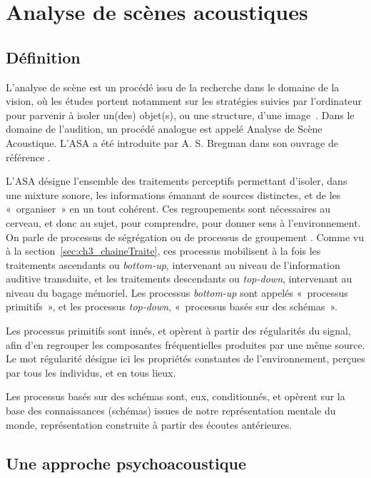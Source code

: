 \section{Analyse de scènes acoustiques}
\label{sec:ch3_ASA}

\subsection{Définition}
\label{sec:ch3_ASAintro}

L'analyse de scène est un procédé issu de la recherche dans le domaine de la vision, où les études portent notamment sur les stratégies suivies par l'ordinateur pour parvenir à isoler un(des) objet(s), ou une structure, d'une image~\citep[p. 12]{mcadams1994penser}. Dans le domaine de l'audition, un procédé analogue est appelé Analyse de Scène Acoustique. L'ASA a été introduite par A. S. Bregman dans son ouvrage de référence \citep{bregman1994auditory}.

L'ASA désigne l'ensemble des traitements perceptifs permettant d'isoler, dans une mixture sonore, les informations émanant de sources distinctes, et de les «~organiser~» en un tout cohérent. Ces regroupements sont nécessaires au cerveau, et donc au sujet, pour comprendre, pour donner sens à l'environnement. On parle de processus de ségrégation ou de processus de groupement \citep{winkler2009modeling}. Comme vu à la section~\ref{sec:ch3_chaineTraite}, ces processus mobilisent à la fois les traitements ascendants ou \emph{bottom-up}, intervenant au niveau de l'information auditive transduite, et les traitements descendants ou \emph{top-down}, intervenant au niveau du bagage mémoriel. Les processus \emph{bottom-up} sont appelés «~processus primitifs~», et les processus \emph{top-down}, «~processus basés sur des schémas~». 

Les processus primitifs sont innés, et opèrent à partir des régularités du signal, afin d'en regrouper les composantes fréquentielles produites par une même source. Le mot régularité désigne ici les propriétés constantes de l'environnement, perçues par tous les individus, et en tous lieux.

Les processus basés sur des schémas sont, eux, conditionnés, et opèrent sur la base des connaissances (schémas) issues de notre représentation mentale du monde, représentation construite à partir des écoutes antérieures.

\subsection{Une approche psychoacoustique}

